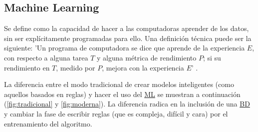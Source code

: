 \subsection{Machine Learning}

Se define como la capacidad de hacer a las computadoras aprender de los datos,
sin ser explícitamente programadas para ello. Una definición técnica puede ser
la siguiente: 'Un programa de computadora se dice que aprende de la experiencia
$ E $, con respecto a alguna tarea $ T $ y alguna métrica de rendimiento $ P $;
si su rendimiento en $ T $, medido por $ P $, mejora con la experiencia $ E $'
\cite{Mitchell1997}.

La diferencia entre el modo tradicional de crear modelos inteligentes (como
aquellos basados en reglas) y hacer el uso del \hyperlink{abbr}{ML} se muestran
a continuación (\autoref{fig:tradicional} y \autoref{fig:moderna}). La
diferencia radica en la inclusión de una \hyperlink{abbr}{BD} y cambiar la fase
de escribir reglas (que es compleja, difícil y cara) por el entrenamiento del
algoritmo.

